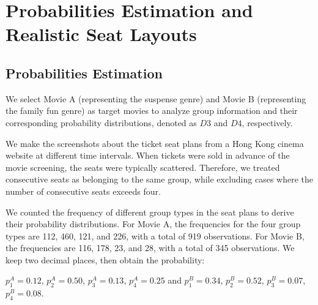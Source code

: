 \section{Probabilities Estimation and Realistic Seat Layouts}\label{appen_3}
\subsection{Probabilities Estimation}
We select Movie A (representing the suspense genre) and Movie B (representing the family fun genre) as target movies to analyze group information and their corresponding probability distributions, denoted as $D3$ and $D4$, respectively.











We make the screenshots about the ticket seat plans from a Hong Kong cinema website at different time intervals. When tickets were sold in advance of the movie screening, the seats were typically scattered. Therefore, we treated consecutive seats as belonging to the same group, while excluding cases where the number of consecutive seats exceeds four. 

We counted the frequency of different group types in the seat plans to derive their probability distributions. For Movie A, the frequencies for the four group types are 112, 460, 121, and 226, with a total of 919 observations. For Movie B, the frequencies are 116, 178, 23, and 28, with a total of 345 observations. We keep two decimal places, then obtain the probability:

$p_1^{A} =  0.12$, $p_2^{A} =  0.50$, $p_3^{A} = 0.13$, $p_4^{A} = 0.25$ and $p_1^{B} =  0.34$, $p_2^{B} =  0.52$, $p_3^{B} = 0.07$, $p_4^{B} = 0.08$.


